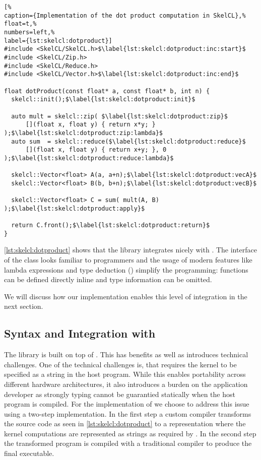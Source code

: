 \begin{lstlisting}[%                                                             
caption={Implementation of the dot product computation in SkelCL},%
float=t,%
numbers=left,%
label={lst:skelcl:dotproduct}]
#include <SkelCL/SkelCL.h>$\label{lst:skelcl:dotproduct:inc:start}$
#include <SkelCL/Zip.h>
#include <SkelCL/Reduce.h>
#include <SkelCL/Vector.h>$\label{lst:skelcl:dotproduct:inc:end}$

float dotProduct(const float* a, const float* b, int n) {
  skelcl::init();$\label{lst:skelcl:dotproduct:init}$

  auto mult = skelcl::zip( $\label{lst:skelcl:dotproduct:zip}$
      [](float x, float y) { return x*y; } );$\label{lst:skelcl:dotproduct:zip:lambda}$
  auto sum  = skelcl::reduce($\label{lst:skelcl:dotproduct:reduce}$
      [](float x, float y) { return x+y; }, 0 );$\label{lst:skelcl:dotproduct:reduce:lambda}$

  skelcl::Vector<float> A(a, a+n);$\label{lst:skelcl:dotproduct:vecA}$
  skelcl::Vector<float> B(b, b+n);$\label{lst:skelcl:dotproduct:vecB}$

  skelcl::Vector<float> C = sum( mult(A, B) );$\label{lst:skelcl:dotproduct:apply}$

  return C.front();$\label{lst:skelcl:dotproduct:return}$
}
\end{lstlisting}

\autoref{lst:skelcl:dotproduct} shows that the \SkelCL library integrates nicely with \Cpp.
The interface of the  class looks familiar to \Cpp programmers and the usage of modern \Cpp features like lambda expressions and type deduction () simplify the programming:
functions can be defined directly inline and type information can be omitted.

We will discuss how our implementation enables this level of integration in the next section.


\subsection{Syntax and Integration with \Cpp}
\label{section:skelcl-library:syntax}

The \SkelCL library is built on top of \OpenCL.
This has benefits as well as introduces technical challenges.
One of the technical challenges is, that \OpenCL requires the kernel to be specified as a string in the host program.
While this enables portability across different hardware architectures, it also introduces a burden on the application developer as strongly typing cannot be guarantied statically when the host program is compiled.
For the implementation of \SkelCL we choose to address this issue using a two-step implementation.
In the first step a custom compiler transforms the source code as seen in \autoref{lst:skelcl:dotproduct} to a representation where the kernel computations are represented as strings as required by \OpenCL.
In the second step the transformed program is compiled with a traditional \Cpp compiler to produce the final executable.

